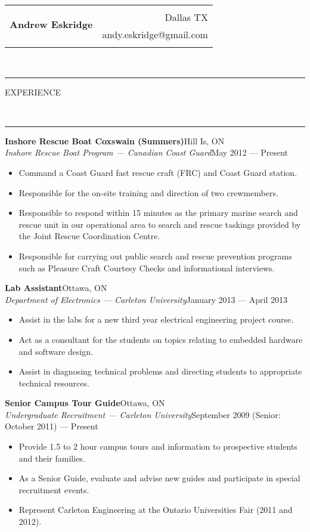 \documentclass[10pt, letterpaper, oneside]{article}
\makeatletter
\newcommand{\name}{Andrew Eskridge}
\newcommand{\city}{Dallas TX}
\newcommand{\email}{andy.eskridge@gmail.com}
\newcommand{\HRule}[2]{\textcolor{#1}{\rule{\linewidth}{#2}}}
\newcommand{\sectiontitle}[1]{\begin{minipage}{\textwidth}\HRule{black}{0.25mm}\vspace{-10pt}\begin{center}\Large\MakeUppercase{#1}\end{center}\end{minipage}\\\HRule{light-grey}{0.15mm}\vspace{\baselineskip}}
\newenvironment{ressection}[1]{
  \sectiontitle{#1}}
  {\vspace{-\baselineskip}}
\newcommand{\resitem}[1]{
    \vspace{2pt}
    \item \begin{flushleft} #1 \end{flushleft}
}
\newcommand{\resentryheader}[4]{
    \vspace{-5pt}
    \textbf{#1}\hspace{\stretch{1}}\textcolor{light-grey}{#3}\\
    \textit{#2}\hspace{\stretch{1}}\textcolor{light-grey}{#4}\\
}
\newenvironment{resentry}[4]{
  \begin{minipage}{\textwidth}
    \resentryheader{#1}{#2}{#3}{#4}
        \vspace{-\baselineskip}
    \begin{itemize}[noitemsep,nolistsep]
}{
    \end{itemize}
        \vspace{\baselineskip}
        \end{minipage}
}
\makeatother
\begin{document}
 
\begin{tabularx}{\linewidth}{X r}
\multirow{3}{*}{\Huge\textbf{\name}} & \\& \city \\& \email\\\\
\end{tabularx}\\
 
\begin{ressection}{experience}
  \begin{resentry}{Inshore Rescue Boat Coxswain (Summers)}{Inshore Rescue Boat Program --- Canadian Coast Guard}{Hill Is, ON}{May 2012 --- Present}
    \resitem{Command a Coast Guard fast rescue craft (FRC) and Coast Guard station.}
    \resitem{Responsible for the on-site training and direction of two crewmembers.}
    \resitem{Responsible to respond within 15 minutes as the primary marine search and rescue unit in our operational area to search and rescue taskings provided by the Joint Rescue Coordination Centre.}
    \resitem{Responsible for carrying out public search and rescue prevention programs such as Pleasure Craft Courtesy Checks and informational interviews.}
  \end{resentry}
 
  \begin{resentry}{Lab Assistant}{Department of Electronics --- Carleton University}{Ottawa, ON}{January 2013 --- April 2013}
    \resitem{Assist in the labs for a new third year electrical engineering project course.}
    \resitem{Act as a consultant for the students on topics relating to embedded hardware and software design.}
    \resitem{Assist in diagnosing technical problems and directing students to appropriate technical resources.}
  \end{resentry}
 
  \begin{resentry}{Senior Campus Tour Guide}{Undergraduate Recruitment --- Carleton University}{Ottawa, ON}{September 2009 (Senior: October 2011) --- Present}
    \resitem{Provide 1.5 to 2 hour campus tours and information to prospective students and their families.}
    \resitem{As a Senior Guide, evaluate and advise new guides and participate in special recruitment events.}
    \resitem{Represent Carleton Engineering at the Ontario Universities Fair (2011 and 2012).}
  \end{resentry}
 

\end{ressection}
\end{document}
